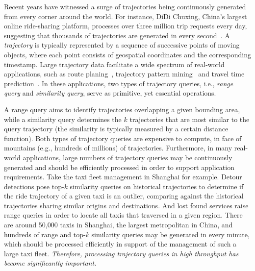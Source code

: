 \documentclass[10pt,conference,letterpaper]{IEEEtran}
\begin{document}
Recent years have witnessed a surge of trajectories being continuously generated from every corner around the world.
For instance, DiDi Chuxing, China's largest online ride-sharing platform, processes over three million trip requests every day, suggesting that thousands of trajectories are generated in every second~\cite{DidiExample}.
A \emph{trajectory} is typically represented by a sequence of successive points of moving objects, where each point consists of geospatial coordinates and the corresponding timestamp.
Large trajectory data facilitate a wide spectrum of real-world applications, such as route planing~\cite{RoutePlan}, trajectory pattern mining~\cite{DBLP:journals/tkde/ZhengZYSZ14} and travel time prediction~\cite{DBLP:conf/gis/LeeSCC12}.
In these applications, two types of trajectory queries, i.e., \emph{range query} and \emph{similarity query}, serve as primitive, yet essential operations.

A range query aims to identify trajectories overlapping a given bounding area, while a similarity query determines the $k$ trajectories that are most similar to the query trajectory (the similarity is typically measured by a certain distance function).
Both types of trajectory queries are expensive to compute, in face of mountains (e.g., hundreds of millions) of trajectories.
Furthermore, in many real-world applications, large numbers of trajectory queries may be continuously generated and should be efficiently processed in order to support application requirements. Take the taxi fleet management in Shanghai for example. Detour detections pose top-$k$ similarity queries on historical trajectories to determine if the ride trajectory of a given taxi is an outlier, comparing against the historical trajectories sharing similar origins and destinations. And lost found services raise range queries in order to locate all taxis that traversed in a given region. There are around 50,000 taxis in Shanghai, the largest metropolitan in China, and hundreds of range and top-$k$ similarity queries may be generated in every minute, which should be processed efficiently in support of the management of such a large taxi fleet. \emph{Therefore, processing trajectory queries in high throughput has become significantly important.}
\end{document}
